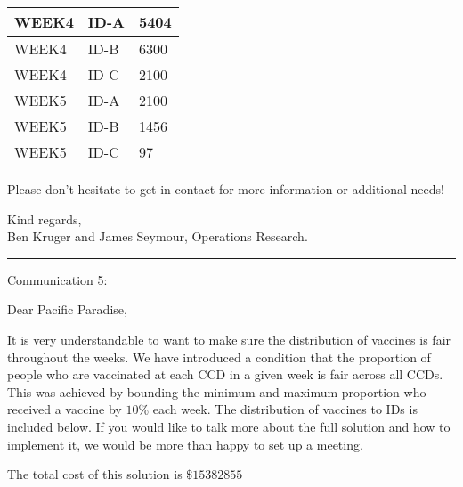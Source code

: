 \documentclass[12pt]{article}
\begin{document}
{\begin{center}
\begin{table}[H]
\begin{tabular}{|l|l|l|}
            WEEK4                               & ID-A                             & 5404                                                \\ \hline
            WEEK4                               & ID-B                             & 6300                                                \\ \hline
            WEEK4                               & ID-C                             & 2100                                                \\ \hline
            WEEK5                               & ID-A                             & 2100                                                \\ \hline
            WEEK5                               & ID-B                             & 1456                                                \\ \hline
            WEEK5                               & ID-C                             & 97                                                  \\ \hline
            \end{tabular}
            \end{table}
    \end{center}

    Please don't hesitate to get in contact for more information or additional needs!
    
    Kind regards,\\
    Ben Kruger and James Seymour, Operations Research.\\
    \hrule
    
    Communication 5:
    
    Dear Pacific Paradise,
    
    It is very understandable to want to make sure the distribution of vaccines is fair throughout the weeks. We have introduced a condition that the proportion of people who are vaccinated at each CCD in a given week is fair across all CCDs. This was achieved by bounding the minimum and maximum proportion who received a vaccine by \(10\)\% each week. The distribution of vaccines to IDs is included below. If you would like to talk more about the full solution and how to implement it, we would be more than happy to set up a meeting.

    The total cost of this solution is \(\$15382855\)

}
\end{document}
